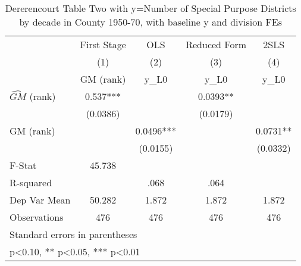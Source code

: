 \begin{table}[htbp]\centering
\def\sym#1{\ifmmode^{#1}\else\(^{#1}\)\fi}
\caption{Dererencourt Table Two with y=Number of Special Purpose Districts by decade in County 1950-70, with baseline y and division FEs}
\begin{tabular}{l*{4}{c}}
\toprule
                    & First Stage   &         OLS   &Reduced Form   &        2SLS   \\
                    &\multicolumn{1}{c}{(1)}&\multicolumn{1}{c}{(2)}&\multicolumn{1}{c}{(3)}&\multicolumn{1}{c}{(4)}\\
                    &\multicolumn{1}{c}{GM  (rank)}&\multicolumn{1}{c}{y\_L0}&\multicolumn{1}{c}{y\_L0}&\multicolumn{1}{c}{y\_L0}\\
\midrule
$\hat{GM}$ (rank)   &       0.537***&               &      0.0393** &               \\
                    &    (0.0386)   &               &    (0.0179)   &               \\
\addlinespace
GM  (rank)          &               &      0.0496***&               &      0.0731** \\
                    &               &    (0.0155)   &               &    (0.0332)   \\
\midrule
F-Stat              &      45.738   &               &               &               \\
R-squared           &               &        .068   &        .064   &               \\
Dep Var Mean        &      50.282   &       1.872   &       1.872   &       1.872   \\
Observations        &         476   &         476   &         476   &         476   \\
\bottomrule
\multicolumn{5}{l}{\footnotesize Standard errors in parentheses}\\
\multicolumn{5}{l}{\footnotesize * p<0.10, ** p<0.05, *** p<0.01}\\
\end{tabular}
\end{table}
